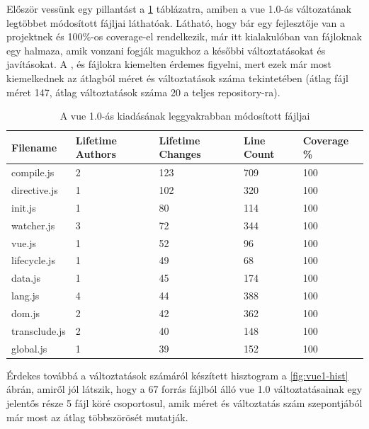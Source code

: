 Először vessünk egy pillantást a \ref{table:vue1-top-files} táblázatra, amiben a vue 1.0-ás változatának legtöbbet módosított fájljai láthatóak. Látható, hogy bár egy fejlesztője van a projektnek és 100\%-os coverage-el rendelkezik, már itt kialakulóban van fájloknak egy halmaza, amik vonzani fogják magukhoz a későbbi változtatásokat és javításokat. A ,  és  fájlokra kiemelten érdemes figyelni, mert ezek már most kiemelkednek az átlagból méret és változtatások száma tekintetében (átlag fájl méret 147, átlag változtatások száma 20 a teljes repository-ra).

\begin{table}[h]
    \centering
    \begin{tabular}{l|l|l|l|l}
        Filename      & Lifetime Authors & Lifetime Changes & Line Count & Coverage \% \\ \hline
        compile.js    & 2                & 123              & 709        & 100         \\
        directive.js  & 1                & 102              & 320        & 100         \\
        init.js       & 1                & 80               & 114        & 100         \\
        watcher.js    & 3                & 72               & 344        & 100         \\
        vue.js        & 1                & 52               & 96         & 100         \\
        lifecycle.js  & 1                & 49               & 68         & 100         \\
        data.js       & 1                & 45               & 174        & 100         \\
        lang.js       & 4                & 44               & 388        & 100         \\
        dom.js        & 2                & 42               & 362        & 100         \\
        transclude.js & 2                & 40               & 148        & 100         \\
        global.js     & 1                & 39               & 152        & 100
    \end{tabular}
    \caption{A vue 1.0-ás kiadásának leggyakrabban módosított fájljai} \label{table:vue1-top-files}
\end{table}

Érdekes továbbá a változtatások számáról készített hisztogram a \ref{fig:vue1-hist} ábrán, amiről jól látszik, hogy a 67 forrás fájlból álló vue 1.0 változtatásainak egy jelentős része 5 fájl köré csoportosul, amik méret és változtatás szám szepontjából már most az átlag többszörösét mutatják.

